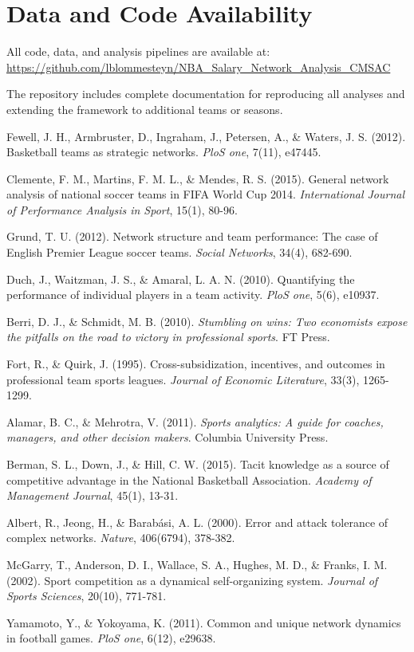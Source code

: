 \documentclass[11pt]{article}
\begin{document}
\section*{Data and Code Availability}

All code, data, and analysis pipelines are available at: \\
\url{https://github.com/lblommesteyn/NBA_Salary_Network_Analysis_CMSAC}

The repository includes complete documentation for reproducing all analyses and extending the framework to additional teams or seasons.

\begin{thebibliography}{99}

Fewell, J. H., Armbruster, D., Ingraham, J., Petersen, A., \& Waters, J. S. (2012). Basketball teams as strategic networks. \textit{PloS one}, 7(11), e47445.

Clemente, F. M., Martins, F. M. L., \& Mendes, R. S. (2015). General network analysis of national soccer teams in FIFA World Cup 2014. \textit{International Journal of Performance Analysis in Sport}, 15(1), 80-96.

Grund, T. U. (2012). Network structure and team performance: The case of English Premier League soccer teams. \textit{Social Networks}, 34(4), 682-690.

Duch, J., Waitzman, J. S., \& Amaral, L. A. N. (2010). Quantifying the performance of individual players in a team activity. \textit{PloS one}, 5(6), e10937.

Berri, D. J., \& Schmidt, M. B. (2010). \textit{Stumbling on wins: Two economists expose the pitfalls on the road to victory in professional sports}. FT Press.

Fort, R., \& Quirk, J. (1995). Cross-subsidization, incentives, and outcomes in professional team sports leagues. \textit{Journal of Economic Literature}, 33(3), 1265-1299.

Alamar, B. C., \& Mehrotra, V. (2011). \textit{Sports analytics: A guide for coaches, managers, and other decision makers}. Columbia University Press.

Berman, S. L., Down, J., \& Hill, C. W. (2015). Tacit knowledge as a source of competitive advantage in the National Basketball Association. \textit{Academy of Management Journal}, 45(1), 13-31.

Albert, R., Jeong, H., \& Barabási, A. L. (2000). Error and attack tolerance of complex networks. \textit{Nature}, 406(6794), 378-382.

McGarry, T., Anderson, D. I., Wallace, S. A., Hughes, M. D., \& Franks, I. M. (2002). Sport competition as a dynamical self-organizing system. \textit{Journal of Sports Sciences}, 20(10), 771-781.

Yamamoto, Y., \& Yokoyama, K. (2011). Common and unique network dynamics in football games. \textit{PloS one}, 6(12), e29638.

\end{thebibliography}
\end{document}
